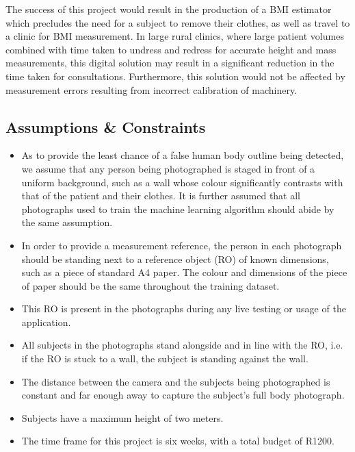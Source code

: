 \documentclass[conference]{IEEEtran}
\begin{document}
The success of this project would result in the production of a BMI estimator which precludes the need for a subject to remove their clothes, as well as travel to a clinic for BMI measurement.
In large rural clinics, where large patient volumes combined with time taken to undress and redress for accurate height and mass measurements, this digital solution may result in a significant reduction in the time taken for consultations.
Furthermore, this solution would not be affected by measurement errors resulting from incorrect calibration of machinery.

\subsection{Assumptions \& Constraints}
\begin{itemize}
	\item As to provide the least chance of a false human body outline being detected, we assume that any person being photographed is staged in front of a uniform background, such as a wall whose colour significantly contrasts with that of the patient and their clothes.
	It is further assumed that all photographs used to train the machine learning algorithm should abide by the same assumption.
	\item In order to provide a measurement reference, the person in each photograph should be standing next to a reference object (RO) of known dimensions, such as a piece of standard A4 paper. The colour and dimensions of the piece of paper should be the same throughout the training dataset.
	\item This RO is present in the photographs during any live testing or usage of the application.
	\item All subjects in the photographs stand alongside and in line with the RO, i.e. if the RO is stuck to a wall, the subject is standing against the wall.
	\item The distance between the camera and the subjects being photographed is constant and far enough away to capture the subject's full body photograph.
	\item Subjects have a maximum height of two meters.
	\item The time frame for this project is six weeks, with a total budget of R1200.
\end{itemize}
\end{document}
